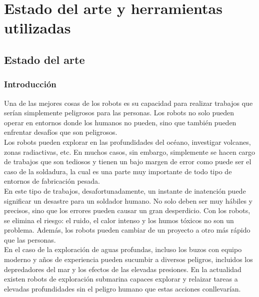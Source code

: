 

\newpage

\chapter[Estado del arte y herramientas utilizadas]{Estado del arte y herramientas utilizadas}
\label{chap:herramientas}


\section{ Estado del arte }

\subsection{Introducción}


Una de las mejores cosas de los robots es su capacidad para realizar trabajos que serían simplemente peligrosos para las personas. Los robots no solo pueden operar en entornos
donde los humanos no pueden, sino que también pueden enfrentar desafíos que son peligrosos.\\

Los robots pueden explorar en las profundidades del océano, investigar volcanes, zonas radiactivas, etc. En muchos casos, sin embargo, simplemente se hacen cargo de trabajos
que son tediosos y tienen un bajo margen de error como puede ser el caso de la soldadura, la cual es una parte muy importante de todo tipo de entornos de fabricación pesada.\\

En este tipo de trabajos, desafortunadamente, un instante de inatención puede significar un desastre para un soldador humano. No solo deben ser muy hábiles y precisos, sino que los errores pueden 
causar un gran desperdicio. Con los robots, se elimina el riesgo: el ruido, el calor intenso y los humos tóxicos no son un problema. Además, los robots pueden cambiar de un
proyecto a otro más rápido que las personas.\\

En el caso de la exploración de aguas profundas, incluso los buzos con equipo moderno y años de experiencia pueden sucumbir a diversos peligros, incluidos los depredadores del
mar y los efectos de las elevadas presiones. En la actualidad existen robots de exploración submarina capaces explorar y relaizar tareas 
a elevadas profundidades sin el peligro humano que estas acciones conllevarían.\\

